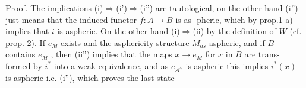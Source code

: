 Proof. The implications (i)$\Rightarrow$(i')$\Rightarrow$(i'') are tautological, on
the other hand (i'') just means that the induced functor $f\colon A\to B$ is as-%
pheric, which by prop.1 a) implies that $i$ is aspheric. On the other
hand (i)$\Rightarrow$(ii) by the definition of $W$ (cf. prop. 2). If $e_M$ exists
and  the asphericity structure $M_{as}$  aspheric, and if $B$ contains $e_M$ ,
then (ii'') implies that the maps $x\to e_M$ for $x$ in $B$  are trans-%
formed by $i^{*}$ into a weak equivalence, and as $e_{A^{\wedge}}$ is aspheric this
implies $i^{*}(x)$ is aspheric i.e. (i''), which  proves the last state-%

